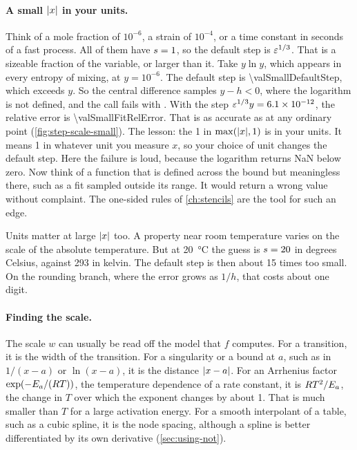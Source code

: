 \paragraph{A small $\lvert x \rvert$ in your units.} Think of a mole fraction of $10^{-6}$, a strain of $10^{-4}$, or a time
constant in seconds of a fast process. All of them have $s = 1$, so the default step is $\varepsilon^{1/3}$. That
is a sizeable fraction of the variable, or larger than it. Take $y \ln y$, which appears in every entropy of mixing, at
$y = 10^{-6}$. The default step is \num{\valSmallDefaultStep}, which exceeds $y$. So the central difference samples
$y - h < 0$, where the logarithm is not defined, and the call fails with . With the step
$\varepsilon^{1/3} y = \num{6.1e-12}$, the relative error is \num{\valSmallFitRelError}. That is as accurate as
at any ordinary point (\cref{fig:step-scale-small}). The lesson: the 1 in $\max(\abs{x}, 1)$ is in your units. It
means 1 in whatever unit you measure $x$, so your choice of unit changes the default step.
Here the failure is loud, because the logarithm returns NaN below zero. Now think of a function that is defined
across the bound but meaningless there, such as a fit sampled outside its range. It would return a wrong value
without complaint. The one-sided rules of \cref{ch:stencils} are the tool for such an edge.

Units matter at large $\lvert x \rvert$ too. A property near room temperature varies on the scale of the absolute
temperature. But at \SI{20}{\degreeCelsius} the guess is $s = 20$ in degrees Celsius, against 293 in kelvin. The
default step is then about 15 times too small. On the rounding branch, where the error grows as $1/h$, that costs
about one digit.

\begin{marginfigure}
\centering

\caption{The V of  for $y \ln y$ at $y = 10^{-6}$. Steps above $y$ cross zero, so the curve stops
there and the default step fails. The step $\epsmach^{1/3} y$ gives the expected accuracy. The 1 in
$\max(\abs{x}, 1)$ is in your units.\label{fig:step-scale-small}}
\end{marginfigure}

\paragraph{Finding the scale.} The scale $w$ can usually be read off the model that $f$ computes. For a transition,
it is the width of the transition. For a singularity or a bound at $a$, such as in $1/(x - a)$ or $\ln(x - a)$, it is
the distance $\lvert x - a \rvert$. For an Arrhenius factor $\exp(-E_a / (R T))$, the temperature dependence of a rate
constant, it is $R T^2 / E_a$, the change in $T$ over which the exponent changes by about 1. That is much smaller
than $T$ for a large activation energy. For a smooth interpolant of a table, such as a cubic spline, it is the node
spacing, although a spline is better differentiated by its own derivative (\cref{sec:using-not}).

